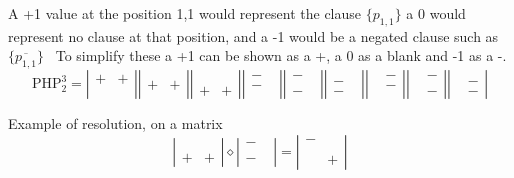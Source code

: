 \documentclass{report}
\newcommand{\set}[1]{\{ #1 \}}
\newcommand{\ol}{\overline}
\DeclareMathOperator{\res}{\diamond} %
\newcommand{\php}{\mathrm{PHP}}
\begin{document}
 A +1 value at the position 1,1 would represent the clause $\set{p_{1,1}}$ a 0 would represent no clause at that position, and a -1 would be a negated clause such as $\set{\ol{p_{1,1}}}$
 \
 To simplify these a +1 can be shown as a +, a 0 as a blank and -1 as a -.
 \[ \php^3_2 =
 \left| \begin{array}{ccc}
 + & + \\
   &   \\
   &   \end{array} \right|
 \left| \begin{array}{ccc}
   &   \\
 + & + \\
   &   \end{array} \right|
 \left| \begin{array}{ccc}
   &   \\
   &   \\
 + & + \end{array} \right|
 \left| \begin{array}{ccc}
 - &   \\
 - &   \\
   &   \end{array} \right|
 \left| \begin{array}{ccc}
 - &   \\
   &   \\
 - &   \end{array} \right|
 \left| \begin{array}{ccc}
   &   \\
 - &   \\
 - &   \end{array} \right|
 \left| \begin{array}{ccc}
   & - \\
   & - \\
   &   \end{array} \right|
 \left| \begin{array}{ccc}
   & - \\
   &   \\
   & - \end{array} \right|
 \left| \begin{array}{ccc}
   &   \\
   & - \\
   & - \end{array} \right|
\] 
 
Example of resolution, on a matrix
\[ \left| \begin{array}{ccc}
   &   \\
   &   \\
 + & + \end{array} \right| \res
 \left| \begin{array}{ccc}
 - &   \\
   &   \\
 - &   \end{array} \right|=
  \left| \begin{array}{ccc}
  - &   \\
    &   \\
    & + \end{array} \right|
  \]
\end{document}
